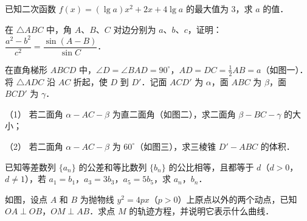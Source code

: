 \begin{question}
已知二次函数 $f(x) = (\lg a)x^2 + 2x + 4\lg a$ 的最大值为 3，求 $a$ 的值．

\end{question}
\begin{question}
在 $\triangle ABC$ 中，角 $A$、$B$、$C$ 对边分别为 $a$、$b$、$c$，证明：$\dfrac{a^2 - b^2}{c^2} = \dfrac{\sin(A - B)}{\sin C}$．

\Needspace{0.4\textheight}
\end{question}
\begin{question}
在直角梯形 $ABCD$ 中，$\angle D = \angle BAD = 90^\circ$，$AD = DC = \frac{1}{2}AB = a$（如图一）．将 $\triangle ADC$ 沿 $AC$ 折起，使 $D$ 到 $D'$．记面 $ACD'$ 为 $\alpha$，面 $ABC$ 为 $\beta$，面 $BCD'$ 为 $\gamma$．

（1） 若二面角 $\alpha-AC-\beta$ 为直二面角（如图二），求二面角 $\beta-BC-\gamma$ 的大小；

（2） 若二面角 $\alpha-AC-\beta$ 为 $60^\circ$（如图三），求三棱锥 $D'-ABC$ 的体积．
\nopagebreak[4]
\begin{center}\end{center}
\nopagebreak[4]
\nopagebreak[4]
\begin{center}\end{center}
\nopagebreak[4]
\nopagebreak[4]
\begin{center}\end{center}
\nopagebreak[4]
\end{question}
\begin{question}
已知等差数列 $\{a_n\}$ 的公差和等比数列 $\{b_n\}$ 的公比相等，且都等于 $d$（$d > 0$，$d \neq 1$），若 $a_1 = b_1$，$a_3 = 3b_3$，$a_5 = 5b_5$，求 $a_n$，$b_n$．

\Needspace{0.4\textheight}
\end{question}
\begin{question}
如图，设点 $A$ 和 $B$ 为抛物线 $y^2 = 4px$（$p > 0$）上原点以外的两个动点，已知 $OA \perp OB$，$OM \perp AB$．求点 $M$ 的轨迹方程，并说明它表示什么曲线．
\nopagebreak[4]
\begin{center}\end{center}
\nopagebreak[4]
\end{question}
